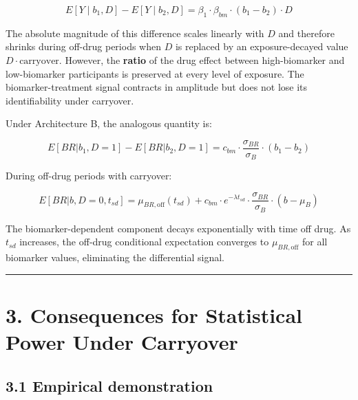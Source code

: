 \documentclass[
]{article}
\begin{document}
\[E[Y \mid b_1, D] - E[Y \mid b_2, D] = \beta_1 \cdot \beta_{bm}
\cdot (b_1 - b_2) \cdot D\]

The absolute magnitude of this difference scales linearly with
\(D\) and therefore shrinks during off-drug periods when \(D\) is
replaced by an exposure-decayed value \(D \cdot \text{carryover}\).
However, the \textbf{ratio} of the drug effect between
high-biomarker and low-biomarker participants is preserved at
every level of exposure. The biomarker-treatment signal
contracts in amplitude but does not lose its identifiability
under carryover.

Under Architecture B, the analogous quantity is:

\[E[BR | b_1, D=1] - E[BR | b_2, D=1] = c_{bm} \cdot
\frac{\sigma_{BR}}{\sigma_B} \cdot (b_1 - b_2)\]

During off-drug periods with carryover:

\[E[BR | b, D=0, t_{sd}] = \mu_{BR,\text{off}}(t_{sd}) +
c_{bm} \cdot e^{-\lambda t_{sd}} \cdot
\frac{\sigma_{BR}}{\sigma_B} \cdot (b - \mu_B)\]

The biomarker-dependent component decays exponentially with
time off drug. As \(t_{sd}\) increases, the off-drug conditional
expectation converges to \(\mu_{BR,\text{off}}\) for all
biomarker values, eliminating the differential signal.

\bigskip\noindent

\rule{\textwidth}{0.4pt}\bigskip

\section{3. Consequences for Statistical Power Under Carryover}

\subsection{3.1 Empirical demonstration}
\end{document}
